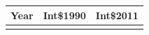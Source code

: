 \begin{tabular}{lrr}
\toprule
Year & Int\$1990 & Int\$2011 \\
\midrule
[To be generated] & & \\
\bottomrule
\end{tabular}
